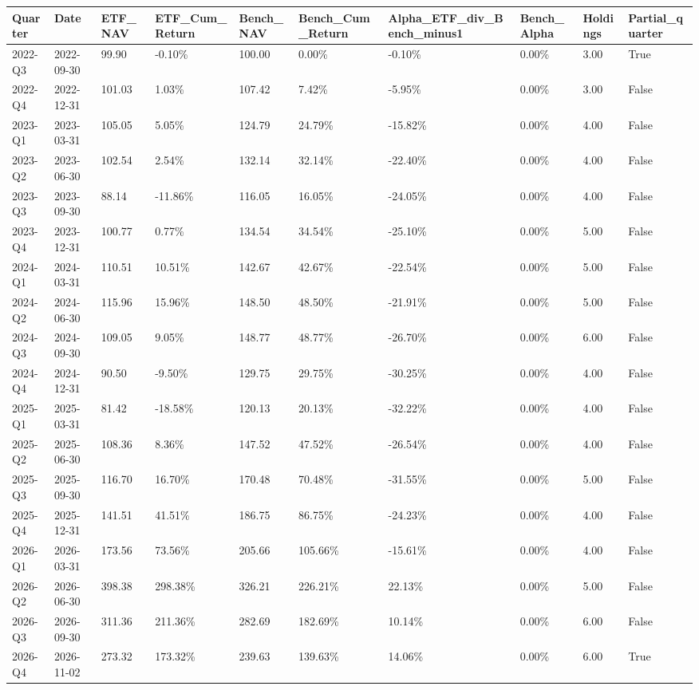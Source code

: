\begin{longtable}{llllllllll}
Quarter & Date & ETF\_NAV & ETF\_Cum\_Return & Bench\_NAV & Bench\_Cum\_Return & Alpha\_ETF\_div\_Bench\_minus1 & Bench\_Alpha & Holdings & Partial\_quarter \\
\hline
2022-Q3 & 2022-09-30 & 99.90 & -0.10\% & 100.00 & 0.00\% & -0.10\% & 0.00\% & 3.00 & True \\
2022-Q4 & 2022-12-31 & 101.03 & 1.03\% & 107.42 & 7.42\% & -5.95\% & 0.00\% & 3.00 & False \\
2023-Q1 & 2023-03-31 & 105.05 & 5.05\% & 124.79 & 24.79\% & -15.82\% & 0.00\% & 4.00 & False \\
2023-Q2 & 2023-06-30 & 102.54 & 2.54\% & 132.14 & 32.14\% & -22.40\% & 0.00\% & 4.00 & False \\
2023-Q3 & 2023-09-30 & 88.14 & -11.86\% & 116.05 & 16.05\% & -24.05\% & 0.00\% & 4.00 & False \\
2023-Q4 & 2023-12-31 & 100.77 & 0.77\% & 134.54 & 34.54\% & -25.10\% & 0.00\% & 5.00 & False \\
2024-Q1 & 2024-03-31 & 110.51 & 10.51\% & 142.67 & 42.67\% & -22.54\% & 0.00\% & 5.00 & False \\
2024-Q2 & 2024-06-30 & 115.96 & 15.96\% & 148.50 & 48.50\% & -21.91\% & 0.00\% & 5.00 & False \\
2024-Q3 & 2024-09-30 & 109.05 & 9.05\% & 148.77 & 48.77\% & -26.70\% & 0.00\% & 6.00 & False \\
2024-Q4 & 2024-12-31 & 90.50 & -9.50\% & 129.75 & 29.75\% & -30.25\% & 0.00\% & 4.00 & False \\
2025-Q1 & 2025-03-31 & 81.42 & -18.58\% & 120.13 & 20.13\% & -32.22\% & 0.00\% & 4.00 & False \\
2025-Q2 & 2025-06-30 & 108.36 & 8.36\% & 147.52 & 47.52\% & -26.54\% & 0.00\% & 4.00 & False \\
2025-Q3 & 2025-09-30 & 116.70 & 16.70\% & 170.48 & 70.48\% & -31.55\% & 0.00\% & 5.00 & False \\
2025-Q4 & 2025-12-31 & 141.51 & 41.51\% & 186.75 & 86.75\% & -24.23\% & 0.00\% & 4.00 & False \\
2026-Q1 & 2026-03-31 & 173.56 & 73.56\% & 205.66 & 105.66\% & -15.61\% & 0.00\% & 4.00 & False \\
2026-Q2 & 2026-06-30 & 398.38 & 298.38\% & 326.21 & 226.21\% & 22.13\% & 0.00\% & 5.00 & False \\
2026-Q3 & 2026-09-30 & 311.36 & 211.36\% & 282.69 & 182.69\% & 10.14\% & 0.00\% & 6.00 & False \\
2026-Q4 & 2026-11-02 & 273.32 & 173.32\% & 239.63 & 139.63\% & 14.06\% & 0.00\% & 6.00 & True \\
\end{longtable}
